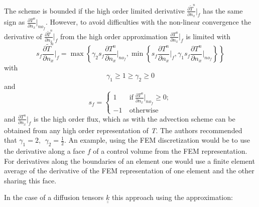 The scheme is bounded if the high order limited derivative $\frac{\partial \widetilde{T}^{n}}{\partial n_x}\vert_{f}$ has the same sign as $\frac{\partial T^{n}}{\partial n_x}\vert_{no_f}$. However, to avoid difficulties with the non-linear convergence the derivative of $\frac{\partial \widetilde{T}^{n}}{\partial n_x}\vert_{f}$ from the high order approximation $\frac{\partial T^{n}}{\partial n_x}\vert_{f}$ is limited with
\begin{displaymath}
s_f \frac{\partial \widetilde{T}^{n}}{\partial n_x}\Big\vert_f
= \max \left\{ \gamma_2 s_f \frac{\partial T^{n}}{\partial n_x}\Big\vert_{no_f},
\min \left\{ s_f \frac{\partial T^{n}}{\partial n_x}\Big\vert_{f},
\gamma_{1} s_{f} \frac{\partial T^{n}}{\partial n_x}\Big\vert_{no_f} \right\}
\right\}
\end{displaymath}
with
\begin{displaymath}
\gamma_1 \geq 1 \geq \gamma_2 \geq 0
\end{displaymath}
and
\begin{displaymath}
s_f =
  \begin{cases}
     1 & \ \text{if} \ \frac{\partial T^n}{\partial n_x}\vert_{no_f} \geq 0; \\
    -1 & \ \text{otherwise} \
\end{cases}
\end{displaymath}
and $\frac{\partial T^{n}}{\partial n_x}\vert_{f}$ is the high order flux, which as with the advection scheme can be obtained from any high order representation of \textit{T}. The authors recommended that  $\gamma_{1} = 2, \ \ \gamma_2 = \frac{1}{2}$.  An example, using the FEM discretization would be to use the derivative along a face $f$ of a control volume from the FEM representation. For derivatives along the boundaries of an element one would use a finite element average of the derivative of the FEM representation of one element and the other sharing this face. 

In the case of a diffusion tensors ${\underline{\underline k}}$ this approach using the approximation: 

